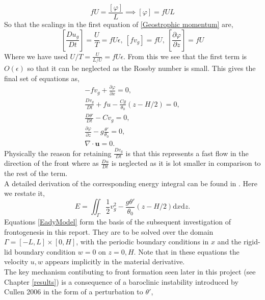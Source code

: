 \begin{equation*}
	fU = \frac{\left[\varphi\right]}{L} \implies \left[\varphi\right] = fUL
\end{equation*}
So that the scalings in the first equation of \ref{Geostrophic momentum} are,
\begin{equation*}
\left[\frac{Du_g}{Dt}\right] = \frac{U}{T} = fU\epsilon, \  \left[fv_g\right] = fU, \ \left[\frac{\partial \varphi}{\partial z}\right] = fU
\end{equation*}
Where we have used $U/T = \frac{U}{L/U} = fU\epsilon$. From this we see that the first term is $O(\epsilon)$ so that it can be neglected as the Rossby number is small. This gives the final set of equations as,
\begin{equation}
	\begin{aligned}
		-fv_g + \frac{\partial \varphi}{\partial x} = 0,\\
		\frac{Dv_g}{Dt} + fu -\frac{Cg}{\theta _0}\left(z-H/2\right) = 0,\\
		\frac{D\theta'}{Dt} - Cv_g = 0,\\
		\frac{\partial \varphi}{\partial z} - g\frac{\theta'}{\theta_0} = 0,\\
		\nabla \cdot \bm{u} = 0.
	\end{aligned}
\label{EadyModel}
\end{equation}
Physically the reason for retaining $\frac{Dv_g}{Dt}$ is that this represents a fast flow in the direction of the front where as $\frac{Du}{Dt}$ is neglected as it is lot smaller in comparison to the rest of the term.\\
\linebreak
A detailed derivation of the corresponding energy integral can be found in \cite{Cullen2006a}. Here we restate it,
\begin{equation}
	E = \iint_{\Gamma} \frac{1}{2}v_g^2 - \frac{g\theta'}{\theta_0}\left(z - H/2\right)\textrm{d}x\textrm{d}z.
\end{equation}
Equations \ref{EadyModel} form the basis of the subsequent investigation of frontogenesis in this report. They are to be solved over the domain $\Gamma = [-L,L] \times [0,H]$, with the periodic boundary conditions in $x$ and the rigid-lid boundary condition $w = 0$ on $z = 0,H$. Note that in these equations the velocity $u,w$ appears implicitly in the material derivative.\\
\linebreak
The key mechanism contibuting to front formation seen later in this project (see Chapter \ref{results}) is a consequence of a baroclinic instability introduced by Cullen 2006 \cite{Cullen2006a} in the form of a perturbation to $\theta'$, 
